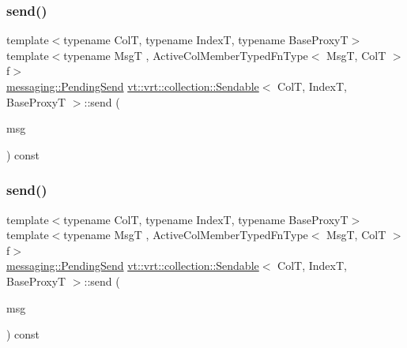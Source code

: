 \mbox{\label{structvt_1_1vrt_1_1collection_1_1_sendable_a321d85ceafaf6525875fb7468a80ac6d}} 
\subsubsection{\texorpdfstring{send()}{send()}\hspace{0.1cm}{\footnotesize\ttfamily [4/6]}}
{\footnotesize\ttfamily template$<$typename ColT, typename IndexT, typename Base\+ProxyT$>$ \\
template$<$typename MsgT , Active\+Col\+Member\+Typed\+Fn\+Type$<$ Msg\+T, Col\+T $>$ f$>$ \\
\hyperlink{structvt_1_1messaging_1_1_pending_send}{messaging\+::\+Pending\+Send} \hyperlink{structvt_1_1vrt_1_1collection_1_1_sendable}{vt\+::vrt\+::collection\+::\+Sendable}$<$ ColT, IndexT, Base\+ProxyT $>$\+::send (\begin{DoxyParamCaption}\item[{MsgT $\ast$}]{msg }\end{DoxyParamCaption}) const}

\mbox{\label{structvt_1_1vrt_1_1collection_1_1_sendable_aa8c102820895d01422c14e8c0993fc90}} 
\subsubsection{\texorpdfstring{send()}{send()}\hspace{0.1cm}{\footnotesize\ttfamily [5/6]}}
{\footnotesize\ttfamily template$<$typename ColT, typename IndexT, typename Base\+ProxyT$>$ \\
template$<$typename MsgT , Active\+Col\+Member\+Typed\+Fn\+Type$<$ Msg\+T, Col\+T $>$ f$>$ \\
\hyperlink{structvt_1_1messaging_1_1_pending_send}{messaging\+::\+Pending\+Send} \hyperlink{structvt_1_1vrt_1_1collection_1_1_sendable}{vt\+::vrt\+::collection\+::\+Sendable}$<$ ColT, IndexT, Base\+ProxyT $>$\+::send (\begin{DoxyParamCaption}\item[{\hyperlink{namespacevt_ab2b3d506ec8e8d1540aede826d84a239}{Msg\+Shared\+Ptr}$<$ MsgT $>$}]{msg }\end{DoxyParamCaption}) const}

